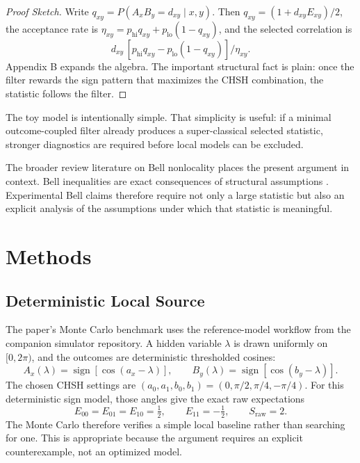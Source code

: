 \documentclass[11pt]{article}
\begin{document}
\begin{proof}[Proof Sketch]
Write $q_{xy} = P(A_x B_y = d_{xy} \mid x,y)$. Then $q_{xy} = (1 + d_{xy}E_{xy})/2$, the acceptance rate is $\eta_{xy} = p_{\mathrm{hi}}q_{xy} + p_{\mathrm{lo}}(1 - q_{xy})$, and the selected correlation is
\[
d_{xy}\,[p_{\mathrm{hi}}q_{xy} - p_{\mathrm{lo}}(1 - q_{xy})] / \eta_{xy}.
\]
Appendix B expands the algebra. The important structural fact is plain: once the filter rewards the sign pattern that maximizes the CHSH combination, the statistic follows the filter.
\end{proof}

The toy model is intentionally simple. That simplicity is useful: if a minimal outcome-coupled filter already produces a super-classical selected statistic, stronger diagnostics are required before local models can be excluded.

The broader review literature on Bell nonlocality places the present argument in context. Bell inequalities are exact consequences of structural assumptions \cite{brunner2014}. Experimental Bell claims therefore require not only a large statistic but also an explicit analysis of the assumptions under which that statistic is meaningful.

\section{Methods}

\subsection{Deterministic Local Source}

The paper's Monte Carlo benchmark uses the reference-model workflow from the companion simulator repository. A hidden variable $\lambda$ is drawn uniformly on $[0, 2\pi)$, and the outcomes are deterministic thresholded cosines:
\[
A_x(\lambda)=\operatorname{sign}\!\left[\cos(a_x-\lambda)\right], \qquad B_y(\lambda)=\operatorname{sign}\!\left[\cos(b_y-\lambda)\right].
\]
The chosen CHSH settings are $(a_0, a_1, b_0, b_1) = (0, \pi/2, \pi/4, -\pi/4)$. For this deterministic sign model, those angles give the exact raw expectations
\[
E_{00}=E_{01}=E_{10}=\tfrac{1}{2}, \qquad E_{11}=-\tfrac{1}{2}, \qquad S_{\mathrm{raw}} = 2.
\]
The Monte Carlo therefore verifies a simple local baseline rather than searching for one. This is appropriate because the argument requires an explicit counterexample, not an optimized model.
\end{document}
